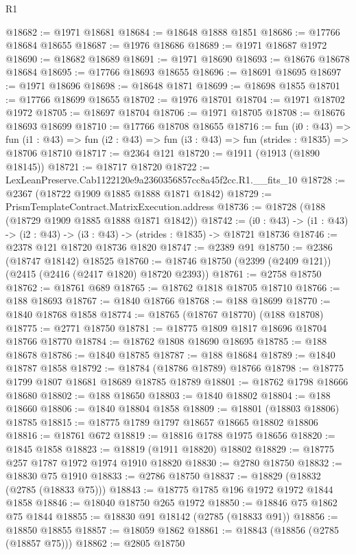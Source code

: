\begin{lexlean}{R1}
\begin{coremodule}
@18682 := @1971 @18681
@18684 := @18648 @1888 @1851
@18686 := @17766 @18684 @18655
@18687 := @1976 @18686
@18689 := @1971 @18687 @1972
@18690 := @18682 @18689
@18691 := @1971 @18690
@18693 := @18676 @18678 @18684
@18695 := @17766 @18693 @18655
@18696 := @18691 @18695
@18697 := @1971 @18696
@18698 := @18648 @1871
@18699 := @18698 @1855
@18701 := @17766 @18699 @18655
@18702 := @1976 @18701
@18704 := @1971 @18702 @1972
@18705 := @18697 @18704
@18706 := @1971 @18705
@18708 := @18676 @18693 @18699
@18710 := @17766 @18708 @18655
@18716 := fun (i0 : @43) =>
  fun (i1 : @43) => fun (i2 : @43) => fun (i3 : @43) => fun (strides : @1835) => @18706 @18710
@18717 := @2364 @121
@18720 := @1911 (@1913 (@1890 @18145))
@18721 := @18717 @18720
@18722 := LexLeanPreserve.Cab1122120e9a2360356857cc8a45f2cc.R1.__fits_10
@18728 := @2367 (@18722 @1909 @1885 @1888 @1871 @1842)
@18729 := PrismTemplateContract.MatrixExecution.address
@18736 := @18728 (@188 (@18729 @1909 @1885 @1888 @1871 @1842))
@18742 := (i0 : @43) -> (i1 : @43) -> (i2 : @43) -> (i3 : @43) -> (strides : @1835) -> @18721 @18736
@18746 := @2378 @121 @18720 @18736 @1820
@18747 := @2389 @91
@18750 := @2386 (@18747 @18142) @18525
@18760 := @18746 @18750 (@2399 (@2409 @121)) (@2415 (@2416 (@2417 @1820) @18720 @2393))
@18761 := @2758 @18750
@18762 := @18761 @689
@18765 := @18762 @1818 @18705 @18710
@18766 := @188 @18693
@18767 := @1840 @18766
@18768 := @188 @18699
@18770 := @1840 @18768 @1858
@18774 := @18765 (@18767 @18770) (@188 @18708)
@18775 := @2771 @18750
@18781 := @18775 @1809 @1817 @18696 @18704 @18766 @18770
@18784 := @18762 @1808 @18690 @18695
@18785 := @188 @18678
@18786 := @1840 @18785
@18787 := @188 @18684
@18789 := @1840 @18787 @1858
@18792 := @18784 (@18786 @18789) @18766
@18798 := @18775 @1799 @1807 @18681 @18689 @18785 @18789
@18801 := @18762 @1798 @18666 @18680
@18802 := @188 @18650
@18803 := @1840 @18802
@18804 := @188 @18660
@18806 := @1840 @18804 @1858
@18809 := @18801 (@18803 @18806) @18785
@18815 := @18775 @1789 @1797 @18657 @18665 @18802 @18806
@18816 := @18761 @672
@18819 := @18816 @1788 @1975 @18656
@18820 := @1845 @1858
@18823 := @18819 (@1911 @18820) @18802
@18829 := @18775 @257 @1787 @1972 @1974 @1910 @18820
@18830 := @2780 @18750
@18832 := @18830 @75 @1910
@18833 := @2786 @18750
@18837 := @18829 (@18832 (@2785 (@18833 @75)))
@18843 := @18775 @1785 @196 @1972 @1972 @1844 @1858
@18846 := @18040 @18750 @265 @1972
@18850 := @18846 @75 @1862 @75 @1844
@18855 := @18830 @91 @18142 (@2785 (@18833 @91))
@18856 := @18850 @18855
@18857 := @18059 @1862
@18861 := @18843 (@18856 (@2785 (@18857 @75)))
@18862 := @2805 @18750

\end{coremodule}
\end{lexlean}
